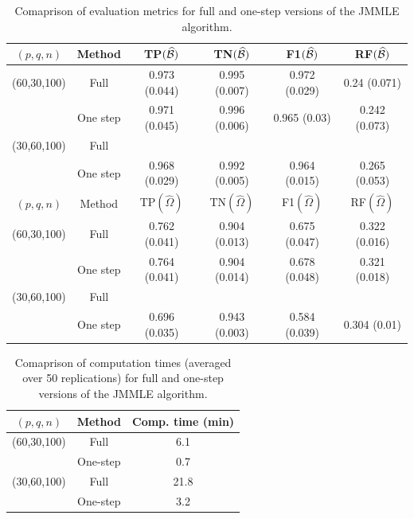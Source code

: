 \begin{table}
\centering
    \begin{tabular}{cccccc}
    \hline
    $(p,q,n)$     & Method         & TP$(\widehat {{\cal{B}}})$            & TN$(\widehat {{\cal{B}}})$            & F1$(\widehat {{\cal{B}}})$ & RF$(\widehat {{\cal{B}}})$             \\\hline
    (60,30,100) & Full         & 0.973 (0.044) & 0.995 (0.007) & 0.972 (0.029)    & 0.24 (0.071)  \\
    ~           & One step     & 0.971 (0.045) &  0.996 (0.006) & 0.965 (0.03)    & 0.242 (0.073) \\
    (30,60,100) & Full          & ~ & ~ & ~   & ~                \\
    ~           & One step & 0.968 (0.029) & 0.992 (0.005)  & 0.964 (0.015)   & 0.265 (0.053) \\ \hline
    \hline
    $(p,q,n)$     & Method         & TP$(\widehat \Omega)$            & TN$(\widehat \Omega)$            & F1$(\widehat \Omega)$ & RF$(\widehat \Omega)$            \\\hline
    (60,30,100) & Full         & 0.762 (0.041) & 0.904 (0.013)   & 0.675 (0.047)   & 0.322 (0.016) \\
    ~           & One step     & 0.764 (0.041) & 0.904 (0.014)   & 0.678 (0.048)   & 0.321 (0.018) \\
    (30,60,100) & Full          & ~ & ~ & ~   & ~                \\
    ~           & One step & 0.696 (0.035) & 0.943 (0.003)  & 0.584 (0.039)   & 0.304 (0.01) \\\hline
    \end{tabular}
    \caption{Comaprison of evaluation metrics for full and one-step versions of the JMMLE algorithm.}
    \label{table:simtable41}
\end{table}

\begin{table}[t]
\centering
  \begin{tabular}{ccc}
    \hline
    $(p,q,n)$     & Method   & Comp. time (min) \\ \hline
    (60,30,100) & Full     & 6.1              \\ 
    ~           & One-step & 0.7              \\ \hline
    (30,60,100) & Full     & 21.8             \\ 
    ~           & One-step & 3.2              \\ \hline
    \end{tabular}
    \caption{Comaprison of computation times (averaged over 50 replications) for full and one-step versions of the JMMLE algorithm.}
    \label{table:simtable42}
\end{table}


